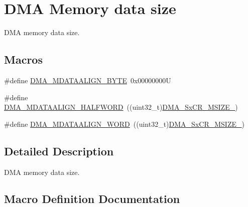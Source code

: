 \hypertarget{group___d_m_a___memory__data__size}{}\section{D\+MA Memory data size}
\label{group___d_m_a___memory__data__size}


D\+MA memory data size.  


\subsection*{Macros}
\begin{DoxyCompactItemize}
\item 
\#define \mbox{\hyperlink{group___d_m_a___memory__data__size_ga9ed07bddf736298eba11508382ea4d51}{D\+M\+A\+\_\+\+M\+D\+A\+T\+A\+A\+L\+I\+G\+N\+\_\+\+B\+Y\+TE}}~0x00000000U
\item 
\#define \mbox{\hyperlink{group___d_m_a___memory__data__size_ga2c7355971c0da34a7ffe50ec87403071}{D\+M\+A\+\_\+\+M\+D\+A\+T\+A\+A\+L\+I\+G\+N\+\_\+\+H\+A\+L\+F\+W\+O\+RD}}~((uint32\+\_\+t)\mbox{\hyperlink{group___peripheral___registers___bits___definition_ga39adb60b3394b61366691b45b8c2b80f}{D\+M\+A\+\_\+\+Sx\+C\+R\+\_\+\+M\+S\+I\+Z\+E\+\_}})
\item 
\#define \mbox{\hyperlink{group___d_m_a___memory__data__size_ga8812da819f18c873249074f3920220b2}{D\+M\+A\+\_\+\+M\+D\+A\+T\+A\+A\+L\+I\+G\+N\+\_\+\+W\+O\+RD}}~((uint32\+\_\+t)\mbox{\hyperlink{group___peripheral___registers___bits___definition_gaa5c2ef08ab52de52b4e1fd785f60e263}{D\+M\+A\+\_\+\+Sx\+C\+R\+\_\+\+M\+S\+I\+Z\+E\+\_}})
\end{DoxyCompactItemize}


\subsection{Detailed Description}
D\+MA memory data size. 



\subsection{Macro Definition Documentation}
\mbox{\label{group___d_m_a___memory__data__size_ga9ed07bddf736298eba11508382ea4d51}} 
